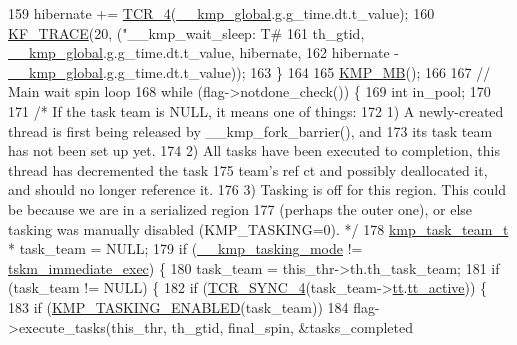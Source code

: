 \begin{DoxyCode}
{159         hibernate += \hyperlink{kmp__os_8h_acd6256e4afba32d90997235fc0a38a74}{TCR\_4}(\hyperlink{kmp_8h_a11b71922a4df46ff9e8dbc68693e8d67}{\_\_kmp\_global}.g.g\_time.dt.t\_value);
160         \hyperlink{kmp__debug_8h_aa77d06a01f304e7b70fe1f4b052a1b57}{KF\_TRACE}(20, (\textcolor{stringliteral}{"\_\_kmp\_wait\_sleep: T#%
161                       th\_gtid, \hyperlink{kmp_8h_a11b71922a4df46ff9e8dbc68693e8d67}{\_\_kmp\_global}.g.g\_time.dt.t\_value, hibernate,
162                       hibernate - \hyperlink{kmp_8h_a11b71922a4df46ff9e8dbc68693e8d67}{\_\_kmp\_global}.g.g\_time.dt.t\_value));
163     \}
164 
165     \hyperlink{kmp__os_8h_ab19ae0836bf2f1ac24e5cfc97c6d7d41}{KMP\_MB}();
166 
167     \textcolor{comment}{// Main wait spin loop}
168     \textcolor{keywordflow}{while} (flag->notdone\_check()) \{
169         \textcolor{keywordtype}{int} in\_pool;
170 
171         \textcolor{comment}{/* If the task team is NULL, it means one of things:}
172 \textcolor{comment}{           1) A newly-created thread is first being released by \_\_kmp\_fork\_barrier(), and}
173 \textcolor{comment}{              its task team has not been set up yet.}
174 \textcolor{comment}{           2) All tasks have been executed to completion, this thread has decremented the task}
175 \textcolor{comment}{              team's ref ct and possibly deallocated it, and should no longer reference it.}
176 \textcolor{comment}{           3) Tasking is off for this region.  This could be because we are in a serialized region}
177 \textcolor{comment}{              (perhaps the outer one), or else tasking was manually disabled (KMP\_TASKING=0).  */}
178         \hyperlink{unionkmp__task__team}{kmp\_task\_team\_t} * task\_team = NULL;
179         \textcolor{keywordflow}{if} (\hyperlink{kmp_8h_a39e87c52fb75a615c2564a822a013a5a}{\_\_kmp\_tasking\_mode} != \hyperlink{kmp_8h_aad1bdfbfac136cfd92611bcee79ca3f2af827998cf4eb3f61723edc4943b86c98}{tskm\_immediate\_exec}) \{
180             task\_team = this\_thr->th.th\_task\_team;
181             \textcolor{keywordflow}{if} (task\_team != NULL) \{
182                 \textcolor{keywordflow}{if} (\hyperlink{kmp__os_8h_af713939cb15fad1a626c6d8789896feb}{TCR\_SYNC\_4}(task\_team->\hyperlink{unionkmp__task__team_a18728e49ce76f29250a4be77cd7a2ff4}{tt}.\hyperlink{structkmp__base__task__team_aa6e9a8311f759172e980d0f75bf81f7b}{tt\_active})) \{
183                     \textcolor{keywordflow}{if} (\hyperlink{kmp_8h_a8b15269c2644fa0ba3ee09b0eb025867}{KMP\_TASKING\_ENABLED}(task\_team))
184                         flag->execute\_tasks(this\_thr, th\_gtid, final\_spin, &tasks\_completed
}}
\end{DoxyCode}
